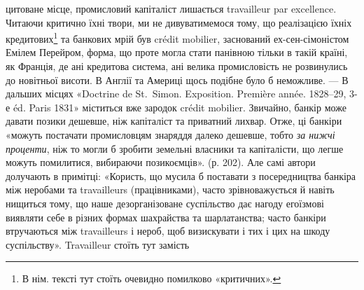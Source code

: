 цитоване місце, промисловий капіталіст лишається travailleur par excellence. Читаючи
критично їхні твори, ми не дивуватимемося тому, що реалізацією їхніх кредитових\footnote*{
В нім. тексті тут стоїть очевидно помилково «критичних». 
}
та банкових мрій був crédit mobilier, заснований ех-сен-сімоністом Емілем
Перейром, форма, що проте могла стати панівною тільки в такій країні, як
Франція, де ані кредитова система, ані велика промисловість не розвинулись
до новітньої висоти. В Англії та Америці щось подібне було б неможливе. —
В дальших місцях «Doctrine de St.~Simon. Exposition. Première année. 1828--29,
3-е éd. Paris 1831» міститься вже зародок crédit mobilier. Звичайно,
банкір може давати позики дешевше, ніж капіталіст та приватний лихвар.
Отже, ці банкіри «можуть постачати промисловцям знаряддя далеко дешевше,
тобто \emph{за нижчі проценти}, ніж то могли б зробити земельні власники
та капіталісти, що легше можуть помилитися, вибираючи позикоємців».
(р. 202). Але самі автори долучають в примітці: «Користь, що мусила б поставати
з посередництва банкіра між неробами та travailleurs (працівниками),
часто зрівноважується й навіть нищиться тому, що наше дезорганізоване суспільство
дає нагоду егоїзмові виявляти себе в різних формах шахрайства та
шарлатанства; часто банкіри втручаються між travailleurs і нероб, щоб визискувати
і тих і цих на шкоду суспільству». Travailleur стоїть тут замість
\parbreak{}  %
